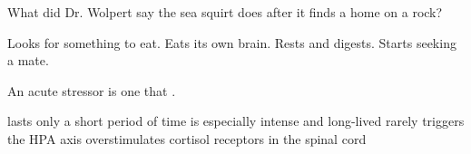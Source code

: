 \documentclass[answers]{exam}
\begin{document}
\begin{questions}
\question What did Dr. Wolpert say the sea squirt does after it finds a home on a rock?
\begin{choices}
\choice Looks for something to eat.
\correctchoice Eats its own brain.
\choice Rests and digests.
\choice Starts seeking a mate.
\end{choices}

\question An acute stressor is one that \fillin.
\begin{choices}
\correctchoice lasts only a short period of time
\choice is especially intense and long-lived
\choice rarely triggers the HPA axis
\choice overstimulates cortisol receptors in the spinal cord
\end{choices}

\end{questions}
\end{document}
